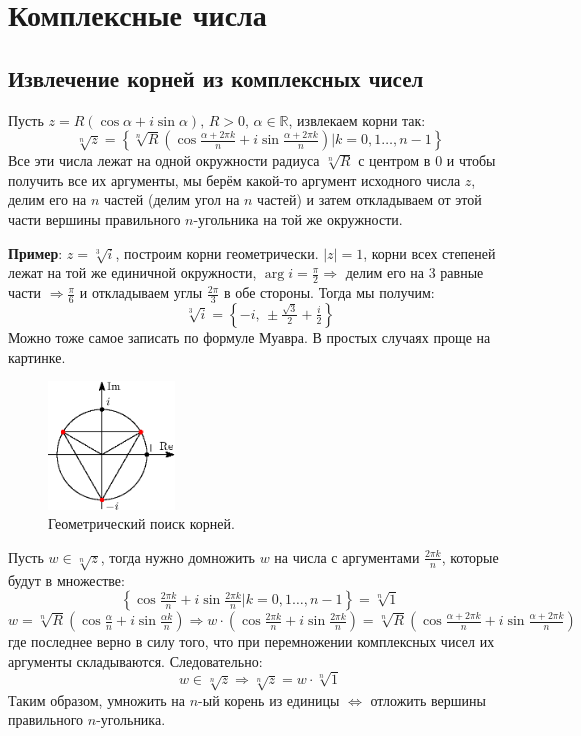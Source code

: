 \documentclass[12pt]{article}
\newcommand{\RN}[1]{%
	\textup{\uppercase\expandafter{\romannumeral#1}}%
}
\newcommand{\MR}{\mathbb{R}}
\theoremstyle{definition}
\begin{document}
\lhead{Алгебра-\RN{1}}
\section*{Комплексные числа}
\subsection*{Извлечение корней из комплексных чисел}

Пусть $z = R(\cos\alpha + i \sin \alpha), \, R > 0, \, \alpha \in \MR$, извлекаем корни так:
$$
	\sqrt[n]{z} = \left\{\sqrt[n]{R}\left(\cos\tfrac{\alpha + 2\pi k}{n} + i \sin \tfrac{\alpha + 2\pi k}{n}\right) \Big\vert k =0,1\dotsc, n-1\right\}
$$
Все эти числа лежат на одной окружности радиуса $\sqrt[n]{R}$ с центром в $0$ и чтобы получить все их аргументы, мы берём какой-то аргумент исходного числа $z$, делим его на $n$ частей (делим угол на $n$ частей) и затем откладываем от этой части вершины правильного $n$-угольника на той же окружности.

\textbf{Пример}: $z = \sqrt[3]{i}$, построим корни геометрически. $|z| = 1$, корни всех степеней лежат на той же единичной окружности, $\arg{i} = \tfrac{\pi}{2} \Rightarrow$ делим его на $3$ равные части $\Rightarrow \tfrac{\pi}{6}$ и откладываем углы $\tfrac{2\pi}{3}$ в обе стороны. Тогда мы получим: 
$$
	\sqrt[3]{i} = \left\{-i ,\, \pm \tfrac{\sqrt{3}}{2} + \tfrac{i}{2}\right\}
$$ 
Можно тоже самое записать по формуле Муавра. В простых случаях проще на картинке.
\begin{figure}[H]
	\centering
	\includegraphics[width=0.3\textwidth]{AL1S3_1.eps}
	\caption{Геометрический поиск корней.}
	\label{AL1S3_1}
\end{figure}

Пусть $w \in \sqrt[n]{z}$, тогда нужно домножить $w$ на числа с аргументами $\tfrac{2\pi k}{n}$, которые будут в множестве: 
$$
	\left\{\cos\tfrac{2\pi k}{n} + i \sin \tfrac{2\pi k}{n} \Big\vert k =0,1\dotsc, n-1\right\} = \sqrt[n]{1} 
$$
$$
	w = \sqrt[n]{R}\left(\cos\tfrac{\alpha }{n} + i \sin \tfrac{\alpha k}{n}\right) \Rightarrow w{\cdot}\left(\cos\tfrac{2\pi k}{n} + i \sin \tfrac{2\pi k}{n}\right) = \sqrt[n]{R}\left(\cos\tfrac{\alpha + 2\pi k}{n} + i \sin \tfrac{\alpha + 2\pi k}{n}\right)
$$
где последнее верно в силу того, что при перемножении комплексных чисел их аргументы складываются. Следовательно:
$$
	w \in \sqrt[n]{z} \Rightarrow \sqrt[n]{z} = w{\cdot}\sqrt[n]{1}
$$
Таким образом, умножить на $n$-ый корень из единицы $\Leftrightarrow$ отложить вершины правильного $n$-угольника.
\end{document}
